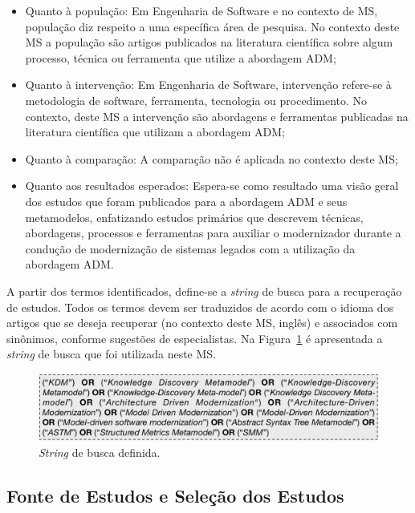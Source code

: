 \begin{itemize}
\item Quanto à população: Em Engenharia de Software e no contexto de MS, população diz respeito a uma específica área de pesquisa. No contexto deste MS a população são artigos publicados na literatura científica sobre algum processo, técnica ou ferramenta que utilize a abordagem ADM;

\item Quanto à intervenção: Em Engenharia de Software, intervenção refere-se à metodologia de software, ferramenta, tecnologia ou procedimento. No contexto, deste MS a intervenção são abordagens e ferramentas publicadas na literatura científica que utilizam a abordagem ADM;

\item Quanto à comparação: A comparação não é aplicada no contexto deste MS;

\item Quanto aos resultados esperados: Espera-se como resultado uma visão geral dos estudos que foram publicados para a abordagem ADM e seus metamodelos, enfatizando estudos primários que descrevem técnicas, abordagens, processos e ferramentas para auxiliar o modernizador durante a condução de modernização de sistemas legados com a utilização da abordagem ADM.

\end{itemize}

A partir dos termos identificados, define-se a \textit{string} de busca para a recuperação de estudos. Todos os termos devem ser traduzidos de acordo com o idioma dos artigos que se deseja recuperar (no contexto deste MS, inglês) e associados com sinônimos, conforme sugestões de especialistas. Na Figura~\ref{fig:string_de_busca} é apresentada a \textit{string} de busca que foi utilizada neste MS.

\begin{figure}[h]
 \caption{\textit{String} de busca definida.}
 \label{fig:string_de_busca}
 \centering
 \includegraphics[scale=0.6]{images/searchStringMS}
 \fautor
\end{figure}

\subsection{Fonte de Estudos e Seleção dos Estudos}

